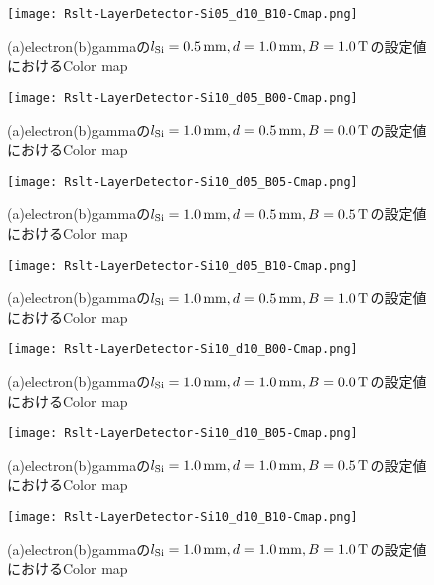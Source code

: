 \documentclass[a4paper,10pt]{jreport}
\begin{document}
\begin{figure}[H]
	\center
	\texttt{[image: Rslt-LayerDetector-Si05\_d10\_B10-Cmap.png]}
	\caption{(a)electron(b)gammaの$l_{\rm{Si}}=\SI{0.5}{mm}, d=\SI{1.0}{mm}, B=\SI{1.0}{T}$の設定値におけるColor map}
	\label{Rslt-LayerDetector-Si05_d10_B10-Cmap}
\end{figure}

\begin{figure}[H]
	\center
	\texttt{[image: Rslt-LayerDetector-Si10\_d05\_B00-Cmap.png]}
	\caption{(a)electron(b)gammaの$l_{\rm{Si}}=\SI{1.0}{mm}, d=\SI{0.5}{mm}, B=\SI{0.0}{T}$の設定値におけるColor map}
	\label{Rslt-LayerDetector-Si10_d05_B00-Cmap}
\end{figure}

\begin{figure}[H]
	\center
	\texttt{[image: Rslt-LayerDetector-Si10\_d05\_B05-Cmap.png]}
	\caption{(a)electron(b)gammaの$l_{\rm{Si}}=\SI{1.0}{mm}, d=\SI{0.5}{mm}, B=\SI{0.5}{T}$の設定値におけるColor map}
	\label{Rslt-LayerDetector-Si10_d05_B05-Cmap}
\end{figure}

\begin{figure}[H]
	\center
	\texttt{[image: Rslt-LayerDetector-Si10\_d05\_B10-Cmap.png]}
	\caption{(a)electron(b)gammaの$l_{\rm{Si}}=\SI{1.0}{mm}, d=\SI{0.5}{mm}, B=\SI{1.0}{T}$の設定値におけるColor map}
	\label{Rslt-LayerDetector-Si10_d05_B10-Cmap}
\end{figure}

\begin{figure}[H]
	\center
	\texttt{[image: Rslt-LayerDetector-Si10\_d10\_B00-Cmap.png]}
	\caption{(a)electron(b)gammaの$l_{\rm{Si}}=\SI{1.0}{mm}, d=\SI{1.0}{mm}, B=\SI{0.0}{T}$の設定値におけるColor map}
	\label{Rslt-LayerDetector-Si10_d10_B00-Cmap}
\end{figure}

\begin{figure}[H]
	\center
	\texttt{[image: Rslt-LayerDetector-Si10\_d10\_B05-Cmap.png]}
	\caption{(a)electron(b)gammaの$l_{\rm{Si}}=\SI{1.0}{mm}, d=\SI{1.0}{mm}, B=\SI{0.5}{T}$の設定値におけるColor map}
	\label{Rslt-LayerDetector-Si10_d10_B05-Cmap}
\end{figure}

\begin{figure}[H]
	\center
	\texttt{[image: Rslt-LayerDetector-Si10\_d10\_B10-Cmap.png]}
	\caption{(a)electron(b)gammaの$l_{\rm{Si}}=\SI{1.0}{mm}, d=\SI{1.0}{mm}, B=\SI{1.0}{T}$の設定値におけるColor map}
	\label{Rslt-LayerDetector-Si10_d10_B10-Cmap}
\end{figure}
\end{document}
